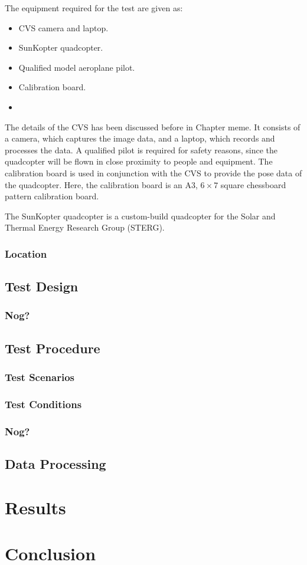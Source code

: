 The equipment required for the test are given as:

\begin{itemize}
    \item CVS camera and laptop.
    \item SunKopter quadcopter.
    \item Qualified model aeroplane pilot.
    \item Calibration board.
    \item 
\end{itemize}

The details of the CVS has been discussed before in Chapter meme. It consists of a camera, which captures the image data, and a laptop, which records and processes the data. A qualified pilot is required for safety reasons, since the quadcopter will be flown in close proximity to people and equipment. The calibration board is used in conjunction with the CVS to provide the pose data of the quadcopter. Here, the calibration board is an A3, $6\times7$ square chessboard pattern calibration board. 

The SunKopter quadcopter is a custom-build quadcopter for the Solar and Thermal Energy Research Group (STERG). 

\subsubsection{Location}
\subsection{Test Design}

\subsubsection{Nog?}

\subsection{Test Procedure}

\subsubsection{Test Scenarios}

\subsubsection{Test Conditions}

\subsubsection{Nog?}

\subsection{Data Processing}

\section{Results}

\section{Conclusion}


